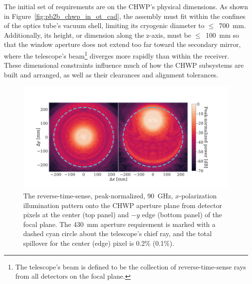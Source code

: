 The initial set of requirements are on the CHWP's physical dimensions. As shown in Figure~\ref{fig:pb2b_chwp_in_ot_cad}, the assembly must fit within the confines of the optics tube's vacuum shell, limiting its cryogenic diameter to $\leq$~700~mm. Additionally, its height, or dimension along the z-axis, must be $\leq$~100~mm so that the window aperture does not extend too far toward the secondary mirror, where the telescope's beam\footnote{The telescope's beam is defined to be the collection of reverse-time-sense rays from all detectors on the focal plane.} diverges more rapidly than within the receiver. These dimensional constraints influence much of how the CHWP subsystems are built and arranged, as well as their clearances and alignment tolerances.

\begin{figure}[!t]
    \centering
    \includegraphics[width=\linewidth, trim=3cm 2cm 5cm 4cm, clip]{CHWPDesign/Figures/chwp_aperture_thesis.pdf}
    \caption{The reverse-time-sense, peak-normalized, 90~GHz, $x$-polarization illumination pattern onto the CHWP aperture plane from detector pixels at the center (top panel) and $-y$ edge (bottom panel) of the focal plane. The 430~mm aperture requirement is marked with a dashed cyan circle about the telescope's chief ray, and the total spillover for the center (edge) pixel is 0.2\% (0.1\%).}
    \label{fig:chwp_aperture}
\end{figure}

